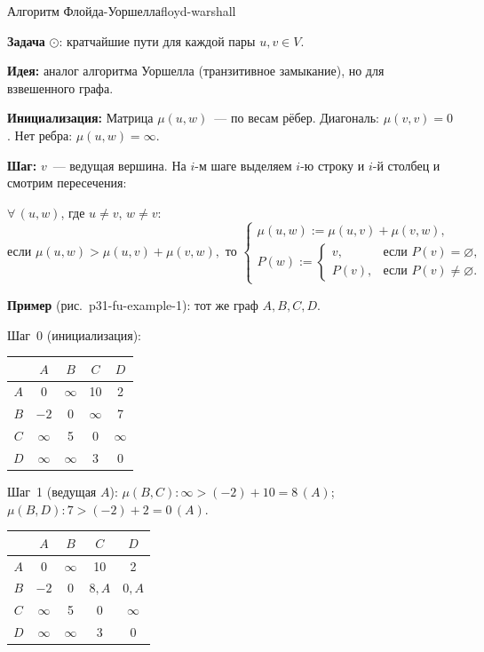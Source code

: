 \begin{algo}{Алгоритм Флойда-Уоршелла}{floyd-warshall}

\textbf{Задача} $\odot$: кратчайшие пути для каждой пары $u, v \in V$.

\textbf{Идея:} аналог алгоритма Уоршелла (транзитивное замыкание), но для взвешенного графа.

\textbf{Инициализация:} Матрица $\mu(u, w)$~--- по весам рёбер. Диагональ: $\mu(v,v) = 0$. Нет ребра: $\mu(u,w) = \infty$.

\textbf{Шаг:} $v$~--- ведущая вершина. На $i$-м шаге выделяем $i$-ю строку и $i$-й столбец и смотрим пересечения:

$\forall\, (u, w)$, где $u \neq v$, $w \neq v$:
\[
  \text{если } \mu(u, w) > \mu(u, v) + \mu(v, w), \text{ то }
  \begin{cases}
    \mu(u, w) := \mu(u, v) + \mu(v, w), \\
    P(w) :=
    \begin{cases}
      v, & \text{если } P(v) = \varnothing, \\
      P(v), & \text{если } P(v) \neq \varnothing.
    \end{cases}
  \end{cases}
\]

\textbf{Пример} (рис.~p31-fu-example-1): тот же граф $A, B, C, D$.


Шаг~0 (инициализация):
\begin{center}
\begin{tabular}{c|cccc}
     & $A$      & $B$      & $C$      & $D$      \\
\hline
$A$  & 0        & $\infty$ & 10       & 2        \\
$B$  & $-2$     & 0        & $\infty$ & 7        \\
$C$  & $\infty$ & 5        & 0        & $\infty$ \\
$D$  & $\infty$ & $\infty$ & 3        & 0        \\
\end{tabular}
\end{center}

Шаг~1 (ведущая $A$): $\mu(B,C)\colon \infty > (-2)+10 = 8\,(A)$; $\mu(B,D)\colon 7 > (-2)+2 = 0\,(A)$.
\begin{center}
\begin{tabular}{c|cccc}
     & $A$      & $B$      & $C$      & $D$      \\
\hline
$A$  & 0        & $\infty$ & 10       & 2        \\
$B$  & $-2$     & 0        & $8, A$   & $0, A$   \\
$C$  & $\infty$ & 5        & 0        & $\infty$ \\
$D$  & $\infty$ & $\infty$ & 3        & 0        \\
\end{tabular}
\end{center}


\end{algo}
